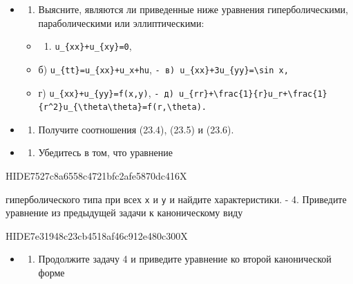 \documentclass[
  ukrainian,
]{article}
\providecommand{\tightlist}{%
  \setlength{\itemsep}{0pt}\setlength{\parskip}{0pt}}
\begin{document}
\begin{itemize}
\item
  \begin{enumerate}
  \def\labelenumi{\arabic{enumi}.}
  \tightlist
  \item
    Выясните, являются ли приведенные ниже уравнения гиперболическими,
    параболическими или эллиптическими:
  \end{enumerate}

  \begin{itemize}
  \tightlist
  \item
    \begin{enumerate}
    \def\labelenumi{\alph{enumi})}
    \tightlist
    \item
      \texttt{u\_\{xx\}+u\_\{xy\}=0},
    \end{enumerate}
  \item
    б) \texttt{u\_\{tt\}=u\_\{xx\}+u\_x+hu},
    \texttt{-\ в)\ \textquotesingle{}u\_\{xx\}+3u\_\{yy\}=\textbackslash{}sin\ x\textquotesingle{},}
  \item
    г) \texttt{u\_\{xx\}+u\_\{yy\}=f(x,y)},
    \texttt{-\ д)\ \textquotesingle{}u\_\{rr\}+\textbackslash{}frac\{1\}\{r\}u\_r+\textbackslash{}frac\{1\}\{r\^{}2\}u\_\{\textbackslash{}theta\textbackslash{}theta\}=f(r,\textbackslash{}theta)\textquotesingle{}.}
  \end{itemize}
\item
  \begin{enumerate}
  \def\labelenumi{\arabic{enumi}.}
  \setcounter{enumi}{1}
  \tightlist
  \item
    Получите соотношения (23.4), (23.5) и (23.6).
  \end{enumerate}
\item
  \begin{enumerate}
  \def\labelenumi{\arabic{enumi}.}
  \setcounter{enumi}{2}
  \tightlist
  \item
    Убедитесь в том, что уравнение
  \end{enumerate}
\end{itemize}

HIDE7527c8a6558c4721bfc2afe5870dc416X

гиперболического типа при всех \texttt{x} и \texttt{y} и найдите
характеристики. - 4. Приведите уравнение из предыдущей задачи к
каноническому виду

HIDE7e31948c23cb4518af46c912e480c300X

\begin{itemize}
\tightlist
\item
  \begin{enumerate}
  \def\labelenumi{\arabic{enumi}.}
  \setcounter{enumi}{4}
  \tightlist
  \item
    Продолжите задачу 4 и приведите уравнение ко второй канонической
    форме
  \end{enumerate}
\end{itemize}
\end{document}
